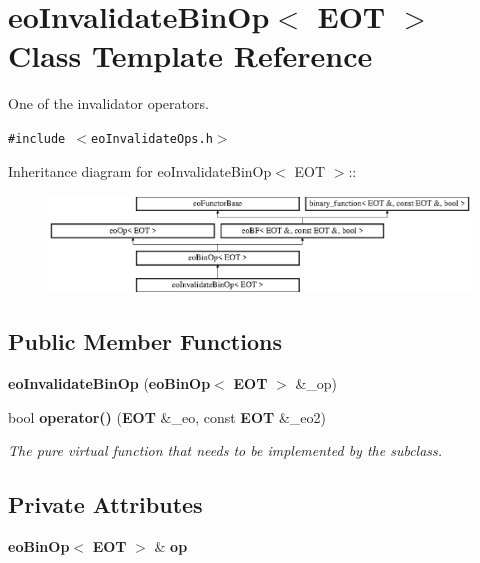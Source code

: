 \section{eo\-Invalidate\-Bin\-Op$<$ EOT $>$ Class Template Reference}
\label{classeo_invalidate_bin_op}
One of the invalidator operators.  


{\tt \#include $<$eo\-Invalidate\-Ops.h$>$}

Inheritance diagram for eo\-Invalidate\-Bin\-Op$<$ EOT $>$::\begin{figure}[H]
\begin{center}
\leavevmode
\includegraphics[height=2.60163cm]{classeo_invalidate_bin_op}
\end{center}
\end{figure}
\subsection*{Public Member Functions}
\begin{CompactItemize}
\item 
{\bf eo\-Invalidate\-Bin\-Op} ({\bf eo\-Bin\-Op}$<$ {\bf EOT} $>$ \&\_\-op)\label{classeo_invalidate_bin_op_a0}

\item 
bool {\bf operator()} ({\bf EOT} \&\_\-eo, const {\bf EOT} \&\_\-eo2)\label{classeo_invalidate_bin_op_a1}

\begin{CompactList}\small\item\em The pure virtual function that needs to be implemented by the subclass. \item\end{CompactList}\end{CompactItemize}
\subsection*{Private Attributes}
\begin{CompactItemize}
\item 
{\bf eo\-Bin\-Op}$<$ {\bf EOT} $>$ \& {\bf op}\label{classeo_invalidate_bin_op_r0}

\end{CompactItemize}


